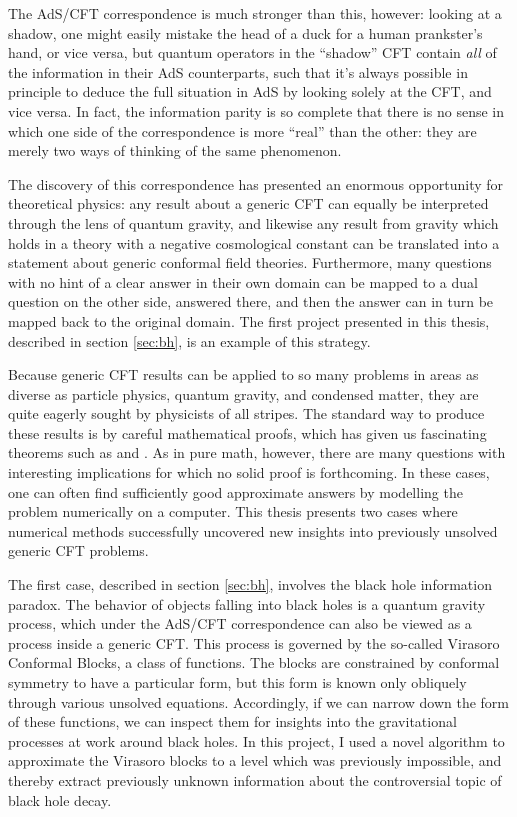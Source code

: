 The AdS/CFT correspondence
is much stronger than this, however: looking at a shadow, one might easily 
mistake the head of a duck for a human prankster's hand, or vice versa, but 
quantum operators in the ``shadow'' CFT contain \emph{all} of the information in
their AdS counterparts, such that it's always possible in principle to deduce 
the full situation in AdS by looking solely at the CFT, and vice versa. In fact,
the information parity is so complete that there is no sense in which one side
of the correspondence is more ``real'' than the other: they are merely two ways
of thinking of the same phenomenon.

The discovery of this correspondence has presented an enormous opportunity for
theoretical physics: any result about a generic CFT can equally be interpreted
through the lens of quantum gravity, and likewise any result from gravity which
holds in a theory with a negative cosmological constant can be translated into
a statement about generic conformal field theories. Furthermore, many questions 
with no hint of a clear answer in their own domain can be mapped to a dual 
question on the other side, answered there, and then the answer can in turn be 
mapped back to the original domain. The first project presented in this thesis, 
described in section \ref{sec:bh}, is an example of this strategy.

Because generic CFT results can be applied to so many problems in areas as 
diverse as particle physics, quantum gravity, and condensed matter, they are 
quite eagerly sought by physicists of all stripes. The standard way to produce
these results is by careful mathematical proofs, which has given us fascinating
theorems such as \citep{example} and \citep{example}. As in pure math, however,
there are many questions with interesting implications for which no solid proof
is forthcoming. In these cases, one can often find sufficiently good approximate
answers by modelling the problem numerically on a computer. This thesis presents
two cases where numerical methods successfully uncovered new insights into 
previously unsolved generic CFT problems.

The first case, described in section \ref{sec:bh}, involves the black hole 
information paradox. The behavior of objects falling into black holes is a
quantum gravity process, which under the AdS/CFT correspondence can also be
viewed as a process inside a generic CFT. This process is governed by the
so-called Virasoro Conformal Blocks, a class of functions. The blocks are 
constrained by conformal symmetry to have a particular form, but this form is
known only obliquely through various unsolved equations. Accordingly, if we can
narrow down the form of these functions, we can inspect them for insights into
the gravitational processes at work around black holes. In this project, I used 
a novel algorithm to approximate the Virasoro blocks to a level which was
previously impossible, and thereby extract previously unknown information about
the controversial topic of black hole decay.

